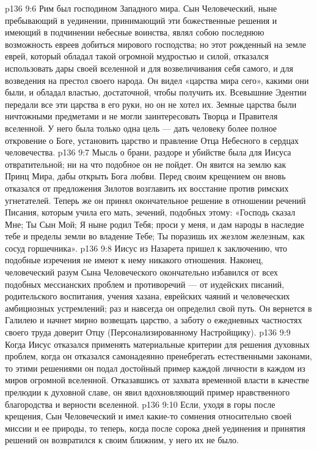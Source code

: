 \vs p136 9:6 Рим был господином Западного мира. Сын Человеческий, ныне пребывающий в уединении, принимающий эти божественные решения и имеющий в подчинении небесные воинства, являл собою последнюю возможность евреев добиться мирового господства; но этот рожденный на земле еврей, который обладал такой огромной мудростью и силой, отказался использовать дары своей вселенной и для возвеличивания себя самого, и для возведения на престол своего народа. Он видел «царства мира сего», какими они были, и обладал властью, достаточной, чтобы получить их. Всевышние Эдентии передали все эти царства в его руки, но он не хотел их. Земные царства были ничтожными предметами и не могли заинтересовать Творца и Правителя вселенной. У него была только одна цель --- дать человеку более полное откровение о Боге, установить царство и правление Отца Небесного в сердцах человечества.
\vs p136 9:7 Мысль о брани, раздоре и убийстве была для Иисуса отвратительной; ни на что подобное он не пойдет. Он явится на землю как Принц Мира, дабы открыть Бога любви. Перед своим крещением он вновь отказался от предложения Зилотов возглавить их восстание против римских угнетателей. Теперь же он принял окончательное решение в отношении речений Писания, которым учила его мать, зечений, подобных этому: «Господь сказал Мне; Ты Сын Мой; Я ныне родил Тебя; проси у меня, и дам народы в наследие тебе и пределы земли во владение Тебе; Ты поразишь их жезлом железным, как сосуд горшечника».
\vs p136 9:8 Иисус из Назарета пришел к заключению, что подобные изречения не имеют к нему никакого отношения. Наконец, человеческий разум Сына Человеческого окончательно избавился от всех подобных мессианских проблем и противоречий --- от иудейских писаний, родительского воспитания, учения хазана, еврейских чаяний и человеческих амбициозных устремлений; раз и навсегда он определил свой путь. Он вернется в Галилею и начнет мирно возвещать царство, а заботу о ежедневных частностях своего труда доверит Отцу (Персонализированному Настройщику).
\vs p136 9:9 \pc Когда Иисус отказался применять материальные критерии для решения духовных проблем, когда он отказался самонадеянно пренебрегать естественными законами, то этими решениями он подал достойный пример каждой личности в каждом из миров огромной вселенной. Отказавшись от захвата временной власти в качестве прелюдии к духовной славе, он явил вдохновляющий пример нравственного благородства и верности вселенной.
\vs p136 9:10 \pc Если, уходя в горы после крещения, Сын Человеческий и имел какие\hyp{}то сомнения относительно своей миссии и ее природы, то теперь, когда после сорока дней уединения и принятия решений он возвратился к своим ближним, у него их не было.
